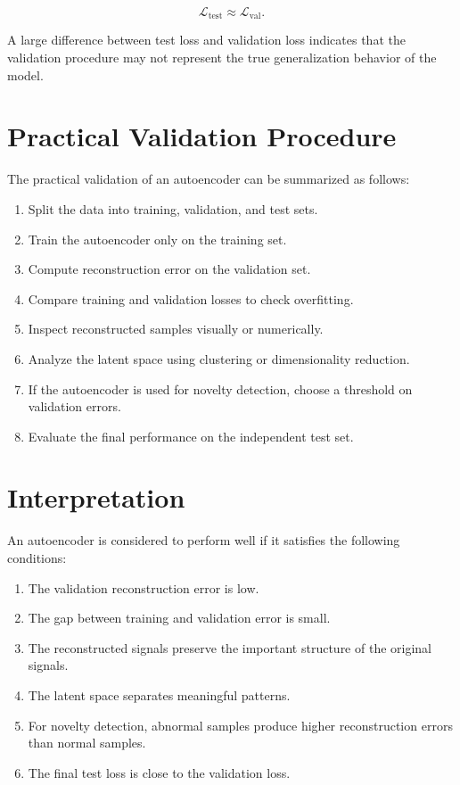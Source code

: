 \documentclass[a4paper]{article}
\begin{document}
        \[
            \mathcal{L}_{\mathrm{test}}
            \approx
            \mathcal{L}_{\mathrm{val}}.
        \]
        
        A large difference between test loss and validation loss indicates that the validation procedure may not represent the true generalization behavior of the model.
    
    
    \section{Practical Validation Procedure}
        
        The practical validation of an autoencoder can be summarized as follows:
        
        \begin{enumerate}
            \item Split the data into training, validation, and test sets.
            \item Train the autoencoder only on the training set.
            \item Compute reconstruction error on the validation set.
            \item Compare training and validation losses to check overfitting.
            \item Inspect reconstructed samples visually or numerically.
            \item Analyze the latent space using clustering or dimensionality reduction.
            \item If the autoencoder is used for novelty detection, choose a threshold on validation errors.
            \item Evaluate the final performance on the independent test set.
        \end{enumerate}
    
    
    \section{Interpretation}
        
        An autoencoder is considered to perform well if it satisfies the following conditions:
        
        \begin{enumerate}
            \item The validation reconstruction error is low.
            \item The gap between training and validation error is small.
            \item The reconstructed signals preserve the important structure of the original signals.
            \item The latent space separates meaningful patterns.
            \item For novelty detection, abnormal samples produce higher reconstruction errors than normal samples.
            \item The final test loss is close to the validation loss.
        \end{enumerate}

%	
%	
\end{document}
